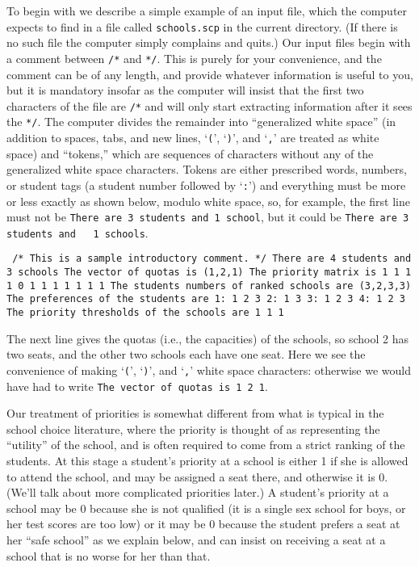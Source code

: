 \documentclass[12pt]{article}
\theoremstyle{definition}
\begin{document}
To begin with we describe a simple example of an input file, which the
computer expects to find in a file called \texttt{schools.scp} in the
current directory.  (If there is no such file the computer simply
complains and quits.)  Our input files begin with a comment between
\texttt{/*} and \texttt{*/}.  This is purely for your convenience, and
the comment can be of any length, and provide whatever information is
useful to you, but it is mandatory insofar as the computer will insist
that the first two characters of the file are \texttt{/*} and will
only start extracting information after it sees the \texttt{*/}.  The
computer divides the remainder into ``generalized white space'' (in
addition to spaces, tabs, and new lines, `\texttt{(}', `\texttt{)}',
and `\texttt{,}' are treated as white space) and ``tokens,'' which are
sequences of characters without any of the generalized white space
characters.  Tokens are either prescribed words, numbers, or student
tags (a student number followed by `\texttt{:}') and everything must
be more or less exactly as shown below, modulo white space, so, for
example, the first line must not be \texttt{There are 3 students and 1
  school}, but it could be \texttt{There are 3 students and \ \ 1
  schools}.

\begin{obeylines}\texttt{
/* This is a sample introductory comment. */
There are 4 students and 3 schools
The vector of quotas is (1,2,1)
The priority matrix is
     1     1     1
     1     0     1
     1     1     1
     1     1     1
The students numbers of ranked schools are (3,2,3,3)
The preferences of the students are
1:  1  2  3  
2:  1  3  
3:  1  2  3  
4:  1  2  3  
The priority thresholds of the schools are
1   1   1   
  }
\end{obeylines}

The next line gives the quotas (i.e., the capacities) of the schools,
so school 2 has two seats, and the other two schools each have one
seat.  Here we see the convenience of making `\texttt{(}',
`\texttt{)}', and `\texttt{,}' white space characters: otherwise we
would have had to write \texttt{The vector of quotas is 1 2 1}.

Our treatment of priorities is somewhat different from what is typical
in the school choice literature, where the priority is thought of as
representing the ``utility'' of the school, and is often required to
come from a strict ranking of the students.  At this stage a student's
priority at a school is either 1 if she is allowed to attend the
school, and may be assigned a seat there, and otherwise it is 0.
(We'll talk about more complicated priorities later.)  A student's
priority at a school may be 0 because she is not qualified (it is a
single sex school for boys, or her test scores are too low) or it may
be 0 because the student prefers a seat at her ``safe school'' as we
explain below, and can insist on receiving a seat at a school that is
no worse for her than that.
\end{document}
